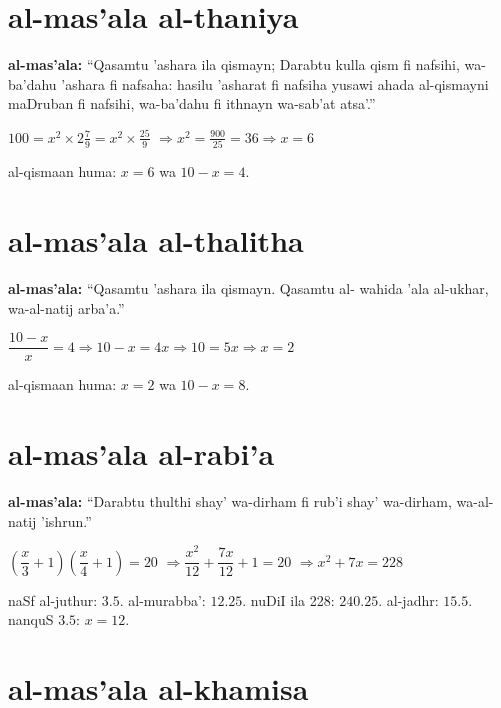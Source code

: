 \documentclass[11pt,a4paper]{book}
\begin{document}
\section*{al-mas'ala al-thaniya}

\begin{mathexplain}
\textbf{al-mas'ala:} ``Qasamtu 'ashara ila qismayn; Darabtu kulla
qism fi nafsihi, wa-ba'dahu 'ashara fi nafsaha: hasilu 'asharat
fi nafsiha yusawi ahada al-qismayni maDruban fi nafsihi, wa-ba'dahu
fi ithnayn wa-sab'at atsa'.''

$100 = x^2 \times 2\tfrac{7}{9} = x^2 \times \tfrac{25}{9}$
$\Rightarrow x^2 = \tfrac{900}{25} = 36 \Rightarrow x = 6$

al-qismaan huma: $x = 6$ wa $10 - x = 4$.
\end{mathexplain}

\section*{al-mas'ala al-thalitha}

\begin{mathexplain}
\textbf{al-mas'ala:} ``Qasamtu 'ashara ila qismayn. Qasamtu al-
wahida 'ala al-ukhar, wa-al-natij arba'a.''

$\dfrac{10 - x}{x} = 4 \Rightarrow 10 - x = 4x \Rightarrow 10 = 5x \Rightarrow x = 2$

al-qismaan huma: $x = 2$ wa $10 - x = 8$.
\end{mathexplain}

\section*{al-mas'ala al-rabi'a}

\begin{mathexplain}
\textbf{al-mas'ala:} ``Darabtu thulthi shay' wa-dirham fi rub'i
shay' wa-dirham, wa-al-natij 'ishrun.''

$\left(\dfrac{x}{3} + 1\right)\left(\dfrac{x}{4} + 1\right) = 20$
$\Rightarrow \dfrac{x^2}{12} + \dfrac{7x}{12} + 1 = 20$
$\Rightarrow x^2 + 7x = 228$

naSf al-juthur: $3.5$. al-murabba': $12.25$.
nuDiI ila 228: $240.25$. al-jadhr: $15.5$.
nanquS $3.5$: $x = 12$.
\end{mathexplain}

\section*{al-mas'ala al-khamisa}
\end{document}
